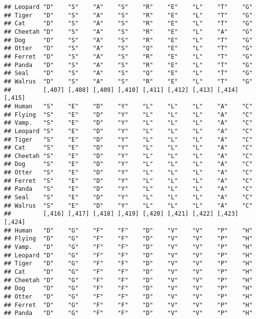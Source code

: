 \documentclass[]{article}
\begin{document}
\begin{verbatim}
## Leopard "D"    "S"    "A"    "S"    "R"    "E"    "L"    "T"    "G"   
## Tiger   "D"    "S"    "A"    "S"    "R"    "E"    "L"    "T"    "G"   
## Cat     "D"    "S"    "A"    "S"    "R"    "E"    "L"    "T"    "G"   
## Cheetah "D"    "S"    "A"    "S"    "R"    "E"    "L"    "A"    "G"   
## Dog     "D"    "S"    "A"    "S"    "R"    "E"    "L"    "T"    "G"   
## Otter   "D"    "S"    "A"    "S"    "Q"    "E"    "L"    "T"    "G"   
## Ferret  "D"    "S"    "A"    "S"    "R"    "E"    "L"    "T"    "G"   
## Panda   "D"    "S"    "A"    "S"    "R"    "E"    "L"    "T"    "G"   
## Seal    "D"    "S"    "A"    "S"    "Q"    "E"    "L"    "T"    "G"   
## Walrus  "D"    "S"    "A"    "S"    "R"    "E"    "L"    "T"    "G"   
##         [,407] [,408] [,409] [,410] [,411] [,412] [,413] [,414] [,415]
## Human   "S"    "E"    "D"    "Y"    "L"    "L"    "L"    "A"    "C"   
## Flying  "S"    "E"    "D"    "Y"    "L"    "L"    "L"    "A"    "C"   
## Vamp.   "S"    "E"    "D"    "Y"    "L"    "L"    "L"    "A"    "C"   
## Leopard "S"    "E"    "D"    "Y"    "L"    "L"    "L"    "A"    "C"   
## Tiger   "S"    "E"    "D"    "Y"    "L"    "L"    "L"    "A"    "C"   
## Cat     "S"    "E"    "D"    "Y"    "L"    "L"    "L"    "A"    "C"   
## Cheetah "S"    "E"    "D"    "Y"    "L"    "L"    "L"    "A"    "C"   
## Dog     "S"    "E"    "D"    "Y"    "L"    "L"    "L"    "A"    "C"   
## Otter   "S"    "E"    "D"    "Y"    "L"    "L"    "L"    "A"    "C"   
## Ferret  "S"    "E"    "D"    "Y"    "L"    "L"    "L"    "A"    "C"   
## Panda   "S"    "E"    "D"    "Y"    "L"    "L"    "L"    "A"    "C"   
## Seal    "S"    "E"    "D"    "Y"    "L"    "L"    "L"    "A"    "C"   
## Walrus  "S"    "E"    "D"    "Y"    "L"    "L"    "L"    "A"    "C"   
##         [,416] [,417] [,418] [,419] [,420] [,421] [,422] [,423] [,424]
## Human   "D"    "G"    "F"    "F"    "D"    "V"    "V"    "P"    "H"   
## Flying  "D"    "G"    "F"    "F"    "D"    "V"    "V"    "P"    "H"   
## Vamp.   "D"    "G"    "F"    "F"    "D"    "V"    "V"    "P"    "H"   
## Leopard "D"    "G"    "F"    "F"    "D"    "V"    "V"    "P"    "H"   
## Tiger   "D"    "G"    "F"    "F"    "D"    "V"    "V"    "P"    "H"   
## Cat     "D"    "G"    "F"    "F"    "D"    "V"    "V"    "P"    "H"   
## Cheetah "D"    "G"    "F"    "F"    "D"    "V"    "V"    "P"    "H"   
## Dog     "D"    "G"    "F"    "F"    "D"    "V"    "V"    "P"    "H"   
## Otter   "D"    "G"    "F"    "F"    "D"    "V"    "V"    "P"    "H"   
## Ferret  "D"    "G"    "F"    "F"    "D"    "V"    "V"    "P"    "H"   
## Panda   "D"    "G"    "F"    "F"    "D"    "V"    "V"    "P"    "H"   

\end{verbatim}
\end{document}

